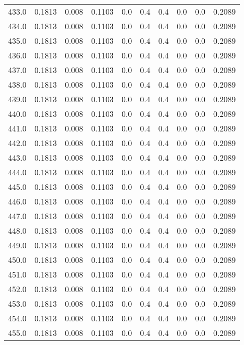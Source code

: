 \begin{longtable}{lrrrrrrrrr}
433.0 & 0.1813 & 0.008 & 0.1103 & 0.0 & 0.4 & 0.4 & 0.0 & 0.0 & 0.2089 \\
434.0 & 0.1813 & 0.008 & 0.1103 & 0.0 & 0.4 & 0.4 & 0.0 & 0.0 & 0.2089 \\
435.0 & 0.1813 & 0.008 & 0.1103 & 0.0 & 0.4 & 0.4 & 0.0 & 0.0 & 0.2089 \\
436.0 & 0.1813 & 0.008 & 0.1103 & 0.0 & 0.4 & 0.4 & 0.0 & 0.0 & 0.2089 \\
437.0 & 0.1813 & 0.008 & 0.1103 & 0.0 & 0.4 & 0.4 & 0.0 & 0.0 & 0.2089 \\
438.0 & 0.1813 & 0.008 & 0.1103 & 0.0 & 0.4 & 0.4 & 0.0 & 0.0 & 0.2089 \\
439.0 & 0.1813 & 0.008 & 0.1103 & 0.0 & 0.4 & 0.4 & 0.0 & 0.0 & 0.2089 \\
440.0 & 0.1813 & 0.008 & 0.1103 & 0.0 & 0.4 & 0.4 & 0.0 & 0.0 & 0.2089 \\
441.0 & 0.1813 & 0.008 & 0.1103 & 0.0 & 0.4 & 0.4 & 0.0 & 0.0 & 0.2089 \\
442.0 & 0.1813 & 0.008 & 0.1103 & 0.0 & 0.4 & 0.4 & 0.0 & 0.0 & 0.2089 \\
443.0 & 0.1813 & 0.008 & 0.1103 & 0.0 & 0.4 & 0.4 & 0.0 & 0.0 & 0.2089 \\
444.0 & 0.1813 & 0.008 & 0.1103 & 0.0 & 0.4 & 0.4 & 0.0 & 0.0 & 0.2089 \\
445.0 & 0.1813 & 0.008 & 0.1103 & 0.0 & 0.4 & 0.4 & 0.0 & 0.0 & 0.2089 \\
446.0 & 0.1813 & 0.008 & 0.1103 & 0.0 & 0.4 & 0.4 & 0.0 & 0.0 & 0.2089 \\
447.0 & 0.1813 & 0.008 & 0.1103 & 0.0 & 0.4 & 0.4 & 0.0 & 0.0 & 0.2089 \\
448.0 & 0.1813 & 0.008 & 0.1103 & 0.0 & 0.4 & 0.4 & 0.0 & 0.0 & 0.2089 \\
449.0 & 0.1813 & 0.008 & 0.1103 & 0.0 & 0.4 & 0.4 & 0.0 & 0.0 & 0.2089 \\
450.0 & 0.1813 & 0.008 & 0.1103 & 0.0 & 0.4 & 0.4 & 0.0 & 0.0 & 0.2089 \\
451.0 & 0.1813 & 0.008 & 0.1103 & 0.0 & 0.4 & 0.4 & 0.0 & 0.0 & 0.2089 \\
452.0 & 0.1813 & 0.008 & 0.1103 & 0.0 & 0.4 & 0.4 & 0.0 & 0.0 & 0.2089 \\
453.0 & 0.1813 & 0.008 & 0.1103 & 0.0 & 0.4 & 0.4 & 0.0 & 0.0 & 0.2089 \\
454.0 & 0.1813 & 0.008 & 0.1103 & 0.0 & 0.4 & 0.4 & 0.0 & 0.0 & 0.2089 \\
455.0 & 0.1813 & 0.008 & 0.1103 & 0.0 & 0.4 & 0.4 & 0.0 & 0.0 & 0.2089 \\

\end{longtable}
